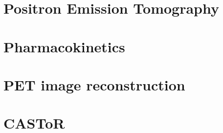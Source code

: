 
\chapter{Positron Emission Tomography}
\label{Chap2_1:PET}
 

\chapter{Pharmacokinetics}
\label{Chap2_2:Pharmacokinetics}


\chapter{PET image reconstruction}
\label{Chap2_3:Reconstruction}


\chapter{CASToR}


